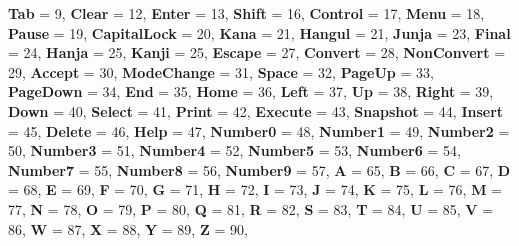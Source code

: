 \begin{DoxyCompactItemize}
{\bfseries Tab} = 9, 
{\bfseries Clear} = 12, 
\newline
{\bfseries Enter} = 13, 
{\bfseries Shift} = 16, 
{\bfseries Control} = 17, 
{\bfseries Menu} = 18, 
\newline
{\bfseries Pause} = 19, 
{\bfseries Capital\+Lock} = 20, 
{\bfseries Kana} = 21, 
{\bfseries Hangul} = 21, 
\newline
{\bfseries Junja} = 23, 
{\bfseries Final} = 24, 
{\bfseries Hanja} = 25, 
{\bfseries Kanji} = 25, 
\newline
{\bfseries Escape} = 27, 
{\bfseries Convert} = 28, 
{\bfseries Non\+Convert} = 29, 
{\bfseries Accept} = 30, 
\newline
{\bfseries Mode\+Change} = 31, 
{\bfseries Space} = 32, 
{\bfseries Page\+Up} = 33, 
{\bfseries Page\+Down} = 34, 
\newline
{\bfseries End} = 35, 
{\bfseries Home} = 36, 
{\bfseries Left} = 37, 
{\bfseries Up} = 38, 
\newline
{\bfseries Right} = 39, 
{\bfseries Down} = 40, 
{\bfseries Select} = 41, 
{\bfseries Print} = 42, 
\newline
{\bfseries Execute} = 43, 
{\bfseries Snapshot} = 44, 
{\bfseries Insert} = 45, 
{\bfseries Delete} = 46, 
\newline
{\bfseries Help} = 47, 
{\bfseries Number0} = 48, 
{\bfseries Number1} = 49, 
{\bfseries Number2} = 50, 
\newline
{\bfseries Number3} = 51, 
{\bfseries Number4} = 52, 
{\bfseries Number5} = 53, 
{\bfseries Number6} = 54, 
\newline
{\bfseries Number7} = 55, 
{\bfseries Number8} = 56, 
{\bfseries Number9} = 57, 
{\bfseries A} = 65, 
\newline
{\bfseries B} = 66, 
{\bfseries C} = 67, 
{\bfseries D} = 68, 
{\bfseries E} = 69, 
\newline
{\bfseries F} = 70, 
{\bfseries G} = 71, 
{\bfseries H} = 72, 
{\bfseries I} = 73, 
\newline
{\bfseries J} = 74, 
{\bfseries K} = 75, 
{\bfseries L} = 76, 
{\bfseries M} = 77, 
\newline
{\bfseries N} = 78, 
{\bfseries O} = 79, 
{\bfseries P} = 80, 
{\bfseries Q} = 81, 
\newline
{\bfseries R} = 82, 
{\bfseries S} = 83, 
{\bfseries T} = 84, 
{\bfseries U} = 85, 
\newline
{\bfseries V} = 86, 
{\bfseries W} = 87, 
{\bfseries X} = 88, 
{\bfseries Y} = 89, 
\newline
{\bfseries Z} = 90, 

\end{DoxyCompactItemize}
